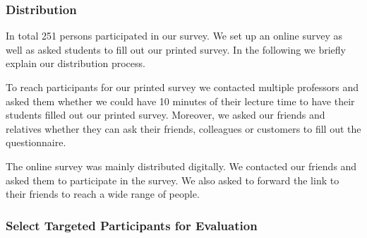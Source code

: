 \subsubsection{Distribution}
In total 251 persons participated in our survey.
 We set up an online survey as well as asked students to fill out our printed survey.
 In the following we briefly explain our distribution process.


\begin{description}[leftmargin=0cm]
	\item[Printed Survey:] To reach participants for our printed survey we contacted multiple professors and asked them whether we could have 10 minutes of their lecture time to have their students filled out our printed survey.
 Moreover, we asked our friends and relatives whether they can ask their friends, colleagues or customers to fill out the questionnaire.

	\item[Online Survey:] The online survey was mainly distributed digitally.
 We contacted our friends and asked them to participate in the survey.
 We also asked to forward the link to their friends to reach a wide range of people.

\end{description}

\subsubsection{Select Targeted Participants for Evaluation}

